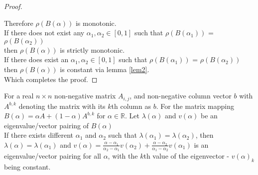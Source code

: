 \begin{proof}
\begin{itemize}[leftmargin=*,labelsep=4mm]
\end{itemize}
Therefore $\rho(B(\alpha))$ is monotonic.\\
If there does not exist any $\alpha_1,\alpha_2\in[0,1]$ such that $\rho(B(\alpha_1))$ = $\rho(B(\alpha_2))$\\
\-\hspace{8mm}then $\rho(B(\alpha))$ is strictly monotonic.\\
If there does exist an $\alpha_1,\alpha_2\in[0,1]$ such that $\rho(B(\alpha_1))$ = $\rho(B(\alpha_2))$\\
\-\hspace{8mm}then $\rho(B(\alpha))$ is constant via lemma \ref{lem2}.\\
Which completes the proof.
\end{proof}


\begin{Theorem}\label{th:3}
For a real $n\times n$ non-negative matrix $A_{i,j}$, and non-negative column vector $b$ with $A^{b,k}$ denoting the matrix with its $k$th column as $b$. For the matrix mapping $B(\alpha) = \alpha A + (1-\alpha)A^{b,k}$ for $\alpha\in\mathbb{R}$. Let $\lambda(\alpha)$ and $v(\alpha)$ be an eigenvalue/vector pairing of $B(\alpha)$\\
If there exists different $\alpha_1$ and $\alpha_2$ such that $\lambda(\alpha_1)=\lambda(\alpha_2)$, then $\lambda(\alpha)=\lambda(\alpha_1)$ and $v(\alpha)=\frac{\alpha-\alpha_1}{\alpha_2-\alpha_1}v(\alpha_2)+\frac{\alpha-\alpha_2}{\alpha_1-\alpha_2}v(\alpha_1)$ is an eigenvalue/vector pairing for all $\alpha$, with the $k$th value of the eigenvector - $v(\alpha)_k$ being constant.
\end{Theorem}

